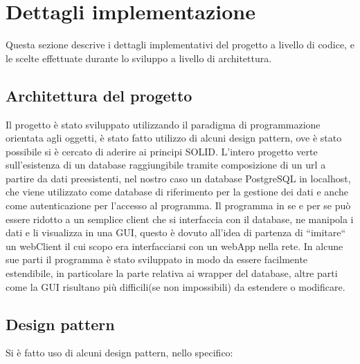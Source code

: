 \documentclass[
    10pt, %
    a4paper, %
    oneside, %
    headinclude,footinclude, %
    BCOR5mm, %
]{scrartcl}
\begin{document}


    \section{Dettagli implementazione}\label{sec:dettagli}

    Questa sezione descrive i dettagli implementativi del progetto a livello di codice, e le scelte effettuate
    durante lo sviluppo a livello di architettura.

    \subsection{Architettura del progetto}\label{subsec:architettura}

    Il progetto è stato sviluppato utilizzando il paradigma di programmazione orientata agli oggetti, è stato
    fatto utilizzo di alcuni design pattern, ove è stato possibile si è cercato di aderire ai principi SOLID\@.
    L'intero progetto verte sull'esistenza di un database raggiungibile tramite composizione di un url a partire
    da dati pre\-esistenti, nel nostro caso un database PostgreSQL in localhost, che viene utilizzato come
    database di riferimento per la gestione dei dati e anche come autenticazione per l'accesso al programma.
    Il programma in se e per se può essere ridotto a un semplice client che si interfaccia con il database,
    ne manipola i dati e li visualizza in una GUI, questo è dovuto all'idea di partenza di ``imitare`` un webClient
    il cui scopo era interfacciarsi con un webApp nella rete.
    In alcune sue parti il programma è stato sviluppato in modo da essere facilmente estendibile,
    in particolare la parte relativa ai wrapper del database, altre parti come la GUI risultano più difficili(se
    non impossibili) da estendere o modificare.

    \subsection{Design pattern}\label{subsec:designPattern}

    Si è fatto uso di alcuni design pattern, nello specifico:
\end{document}

